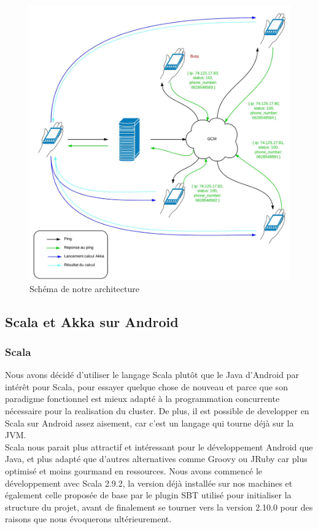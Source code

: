 \documentclass[a4paper,12pt]{article}
\begin{document}
\begin{figure}[h]
\centering
\includegraphics[scale=0.2]{images/gcm.png}
\caption{Schéma de notre architecture}
\end{figure}

\newpage

\subsection{Scala et Akka sur Android}

\subsubsection{Scala}
Nous avons décidé d'utiliser le langage Scala plutôt que le Java d'Android par
intérêt pour Scala, pour essayer quelque chose de nouveau et parce que son
paradigme fonctionnel est mieux adapté à la programmation concurrente
nécessaire pour la realisation du cluster. De plus, il est possible de
developper en Scala sur Android assez aisement, car c'est un langage qui tourne
déjà sur la JVM.\\ Scala nous parait plus attractif et intéressant pour le
développement Android que Java, et plus adapté que d’autres alternatives comme
Groovy ou JRuby car plus optimisé et moins gourmand en ressources.  Nous avons
commencé le développement avec Scala 2.9.2, la version déjà installée sur nos
machines et également celle proposée de base par le plugin SBT utilisé pour
initialiser la structure du projet, avant de finalement se tourner vers la
version 2.10.0 pour des raisons que nous évoquerons ultérieurement.\\
\end{document}
